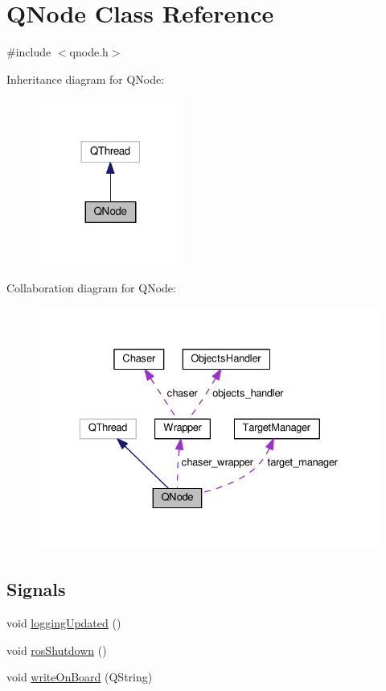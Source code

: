 \hypertarget{class_q_node}{}\section{Q\+Node Class Reference}
\label{class_q_node}


{\ttfamily \#include $<$qnode.\+h$>$}



Inheritance diagram for Q\+Node\+:\nopagebreak
\begin{figure}[H]
\begin{center}
\leavevmode
\includegraphics[width=134pt]{class_q_node__inherit__graph}
\end{center}
\end{figure}


Collaboration diagram for Q\+Node\+:
\nopagebreak
\begin{figure}[H]
\begin{center}
\leavevmode
\includegraphics[width=329pt]{class_q_node__coll__graph}
\end{center}
\end{figure}
\subsection*{Signals}
\begin{DoxyCompactItemize}
\item 
void \hyperlink{class_q_node_abddcd4e0187f6d4513bbee7ba4656827}{logging\+Updated} ()
\item 
void \hyperlink{class_q_node_a7888b171c93c5f47334f5d2815adf445}{ros\+Shutdown} ()
\item 
void \hyperlink{class_q_node_a80d139522a1333db2c6ea33914c32378}{write\+On\+Board} (Q\+String)
\end{DoxyCompactItemize}

